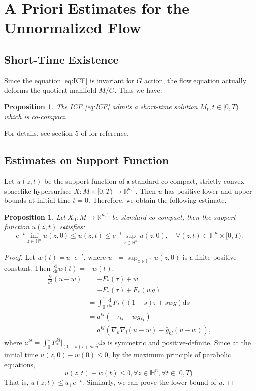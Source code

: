 \documentclass[reqno]{amsart}
\newtheorem{proposition}[theorem]{Proposition}
\theoremstyle{remark}
\newcommand{\dd}{\ensuremath{\text{d}}}
\newcommand{\R}{\ensuremath{\mathbb{R}}}
\renewcommand{\H}{{\mathbb{H}}}
\newcommand{\pd}[2]{\frac{\partial {#1}}{\partial {#2}}}
\newcommand{\bnabla}{\overline{\nabla}}
\newcommand{\bg}{\bar{g}}
\theoremstyle{definition}
\numberwithin{equation}{section}
\begin{document}
\section{A Priori Estimates for the Unnormalized Flow}\label{sec:unnormalized-flow}

\subsection{Short-Time Existence}
Since the equation \eqref{eq:ICF} is invariant for \(G\) action, the flow equation actually deforms the quotient manifold \(M/G\). Thus we have:  

\begin{proposition}
    The ICF \eqref{eq:ICF} admits a short-time solution \(M_t, t\in [0,T)\) which is co-compact.  
\end{proposition}
For details, see section 5 of \cite{co-compact} for reference.


\subsection{Estimates on Support Function}
Let \(u(z,t)\) be the support function of a standard co-compact, strictly convex spacelike hypersurface \(X:M\times [0,T) \to\R^{n,1}\). Then \(u\) has positive lower and upper bounds at initial time \(t = 0\). Therefore, we obtain the following estimate.
\begin{proposition}\label{prop:support-estimate}
    Let \(X_0:M\to \R^{n,1}\) be standard co-compact, then the support function \(u(z,t)\) satisfies:
    \begin{equation}\label{eq:std supp func est}
        e^{-t}\inf_{z\in \H^n}u(z,0) \leq u(z,t) \leq e^{-t}\sup_{z\in \H^n}u(z,0), \quad \forall (z,t)\in \H^n \times [0,T).
    \end{equation}
\end{proposition}
\begin{proof}
    Let \(w(t) = u_+ e^{-t}\), where \(u_+ = \sup_{z\in \H^n} u(z,0)\) is a finite positive constant. Then \(\frac{\dd }{\dd t}w(t) = -w(t)\). 
    \[ \begin{aligned}
        \pd{}{t}(u - w) &= -F_*(\tau) + w \\
        &= -F_*(\tau) + F_*(w\bg) \\
        &= \int_0^1 \frac{\dd}{\dd s}F_*((1-s)\tau + sw\bg)\dd s \\
        &= a^{kl}(-\tau_{kl} + w\bg_{kl}) \\
        &= a^{kl}\left(\bnabla_k \bnabla_l(u - w)-\bg_{kl}(u - w) \right),
    \end{aligned}
    \]
    where \(a^{kl} = \int_0^1 F_*^{kl}\big|_{(1-s)\tau+ sw\bg} \dd s\) is symmetric and positive-definite. Since at the initial time \(u(z,0)-w(0)\leq 0\), by the maximum principle of parabolic equations, 
    \[ u(z,t) - w(t) \leq 0, \forall z\in \H^n, \forall t\in[0,T).\] 
    That is, \(u(z,t)\leq u_+ e^{-t}\). Similarly, we can prove the lower bound of $u$.
    \end{proof}
\end{document}
